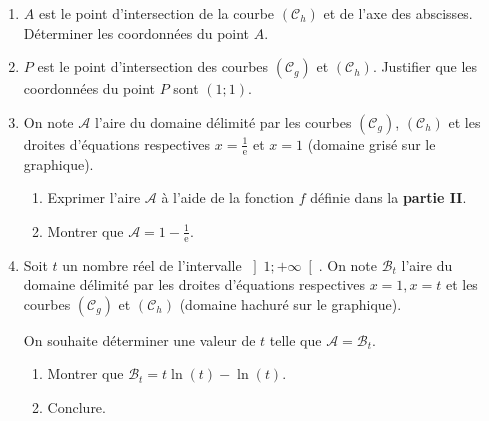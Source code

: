 \begin{center}
\end{center}

\begin{enumerate}
     \item
     $A$ est le point d'intersection de la courbe $\left(\mathscr C_{h}\right)$ et de l'axe des abscisses. Déterminer les coordonnées du point $A$.
     \item
     $P$ est le point d'intersection des courbes $\left(\mathscr C_{g}\right)$ et $\left(\mathscr C_{h}\right)$. Justifier que les coordonnées du point $P$ sont $\left(1 ; 1\right)$.
     \item
     On note $\mathscr A$ l'aire du domaine délimité par les courbes $\left(\mathscr C_{g}\right)$, $\left(\mathscr C_{h}\right)$ et les droites d'équations respectives $x=\frac{1}{\text{e}}$ et $x=1$ (domaine grisé sur le graphique).


     \begin{enumerate}[label=\alph*.]
          \item
          Exprimer l'aire $\mathscr A$ à l'aide de la fonction $f$ définie dans la \textbf{partie II}.
          \item
          Montrer que $\mathscr A=1-\frac{1}{\text{e}}$.
     \end{enumerate}
     \item
     Soit $t$ un nombre réel de l'intervalle $\left]1; +\infty \right[$. On note $\mathscr B_{t}$ l'aire du domaine délimité par les droites d'équations respectives $x=1, x=t$ et les courbes $\left(\mathscr C_{g}\right)$ et $\left(\mathscr C_{h}\right)$ (domaine hachuré sur le graphique).
     \par
     On souhaite déterminer une valeur de $t$ telle que $\mathscr A=\mathscr B_{t}$.
     \begin{enumerate}[label=\alph*.]
          \item
          Montrer que $\mathscr B_{t}=t \ln \left(t\right)-\ln \left(t\right)$.
          \item
          Conclure.
     \end{enumerate}
\end{enumerate}
